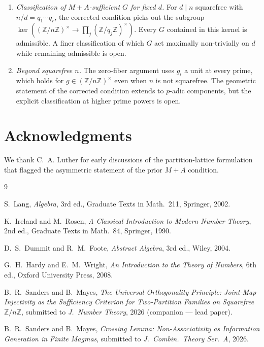 \documentclass[11pt,reqno]{amsart}
\theoremstyle{plain}
\theoremstyle{definition}
\newcommand{\Z}{\mathbb{Z}}
\newcommand{\Zns}{(\Z/n\Z)^{\times}}
\begin{document}
\begin{enumerate}[label=(\alph*)]
\item \emph{Classification of $M{+}A$-sufficient $G$ for fixed $d$.} For $d \mid n$ squarefree with $n/d = q_1 \cdots q_r$, the corrected condition picks out the subgroup $\ker(\Zns \to \prod_j (\Z/q_j\Z)^{\times})$. Every $G$ contained in this kernel is admissible. A finer classification of which $G$ act maximally non-trivially on $d$ while remaining admissible is open.
\item \emph{Beyond squarefree $n$.} The zero-fiber argument uses $g_i$ a unit at every prime, which holds for $g \in \Zns$ even when $n$ is not squarefree. The geometric statement of the corrected condition extends to $p$-adic components, but the explicit classification at higher prime powers is open.
\end{enumerate}

\section*{Acknowledgments}

We thank C.~A. Luther for early discussions of the partition-lattice formulation that flagged the asymmetric statement of the prior $M{+}A$ condition.

\begin{thebibliography}{9}

S.~Lang,
\emph{Algebra}, 3rd ed.,
Graduate Texts in Math.\ 211, Springer, 2002.

K.~Ireland and M.~Rosen,
\emph{A Classical Introduction to Modern Number Theory}, 2nd ed.,
Graduate Texts in Math.\ 84, Springer, 1990.

D.~S.~Dummit and R.~M.~Foote,
\emph{Abstract Algebra}, 3rd ed.,
Wiley, 2004.

G.~H.~Hardy and E.~M.~Wright,
\emph{An Introduction to the Theory of Numbers}, 6th ed.,
Oxford University Press, 2008.

B.~R.~Sanders and B.~Mayes,
\emph{The Universal Orthogonality Principle: Joint-Map Injectivity as the Sufficiency Criterion for Two-Partition Families on Squarefree $\Z/n\Z$},
submitted to \emph{J.\ Number Theory}, 2026 (companion --- lead paper).

B.~R.~Sanders and B.~Mayes,
\emph{Crossing Lemma: Non-Associativity as Information Generation in Finite Magmas},
submitted to \emph{J.\ Combin.\ Theory Ser.\ A}, 2026.

\end{thebibliography}
\end{document}
